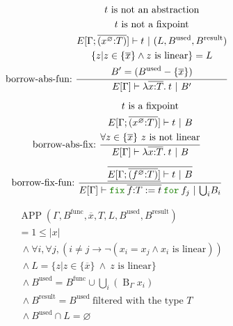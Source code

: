 \documentclass[a4paper,fleqn]{article}
\newcommand{\kwfix}{\mbox{\color{mygreen}\ttfamily fix}}
\newcommand{\kwfor}{\mbox{\color{mygreen}\ttfamily for}}
\newcommand{\lam}[2]{\lambda #1.\:#2}
\newcommand{\lassum}[2]{(#1\mathord{:}#2)}
\newcommand{\ofix}[2]{\kwfix\:{#1}\:\kwfor\:{#2}}
\newcommand{\tbigcup}{{\textstyle\bigcup}}
\newcommand{\breakrule}{\\[0.5em]}
\DeclareMathOperator{\APP}{APP}
\DeclareMathOperator{\Bop}{B}
\newcommand{\rep}[1]{\overline{#1}}
\begin{document}
\begin{gather*}
  \text{borrow-abs-fun:}~
    \dfrac{
      \begin{gathered}
        \text{$t$ is not an abstraction} \\
        \text{$t$ is not a fixpoint} \\
        E[\Gamma;\rep{\lassum{x^\varnothing}{T}}] \vdash t ~|~ (L,B^\text{used},B^\text{result}) \\
        \{ z | z \in \{\rep{x}\} \wedge \text{$z$ is linear} \} = L \\
        B' = (B^\text{used} - \{\rep{x}\}) \\
      \end{gathered}
    }{
      E[\Gamma] \vdash \lam{\rep{x{:}T}}{t} ~|~ B'
    } \breakrule
  \text{borrow-abs-fix:}~
    \dfrac{
      \begin{gathered}
        \text{$t$ is a fixpoint} \\
        E[\Gamma;\rep{\lassum{x^\varnothing}{T}}] \vdash t ~|~ B \\
        \forall z \in \{\rep{x}\}~ \text{$z$ is not linear} \\
      \end{gathered}
    }{
      E[\Gamma] \vdash \lam{\rep{x{:}T}}{t} ~|~ B
    } \breakrule
  \text{borrow-fix-fun:}~
    \dfrac{
      \begin{gathered}
        \rep{\underline{E[\Gamma;\rep{\lassum{f^\varnothing}{T}}]} \vdash t ~|~ B} \\
      \end{gathered}
    }{
      E[\Gamma] \vdash \ofix{\rep{f{:}T:=t}}{f_j} ~|~ {\tbigcup_i B_i}
    }
\end{gather*}

\begin{align*}
  &\APP(\Gamma, B^\text{func}, \rep{x}, T, L, B^\text{used}, B^\text{result}) \\
  &= 1 \leq |x| \\
  &~\wedge \forall i, \forall j, (i \neq j \rightarrow \neg (x_i = x_j \wedge \text{$x_i$ is linear})) \\
  &~\wedge L = \{ z | z \in \{\rep{x}\} ~\wedge~ \text{$z$ is linear} \} \\
  &~\wedge B^\text{used} = B^\text{func} \cup \tbigcup_i (\Bop_\Gamma x_i) \\
  &~\wedge B^\text{result} = B^\text{used} ~\text{filtered with the type $T$} \\
  &~\wedge B^\text{used} \cap L = \varnothing \\
\end{align*}
\end{document}
